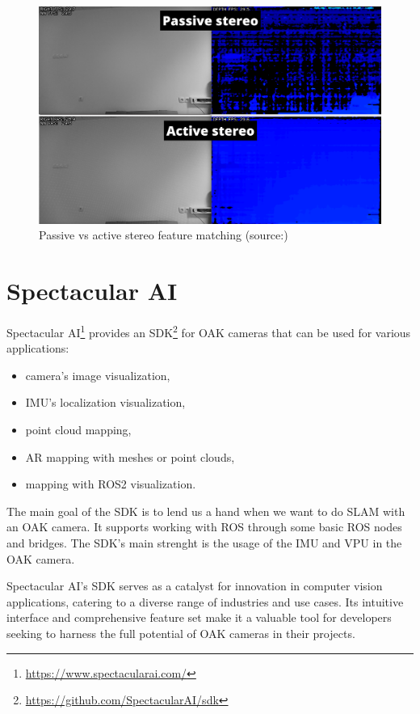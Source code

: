 \begin{figure}[H]
    \centering
    \includegraphics[width=150mm, keepaspectratio]{figures/active-vs-passive-stereo.png}
    \caption{Passive vs active stereo feature matching (source:\cite{ActivePassiveStereo})}
    \label{fig:active-passive-stereo}
\end{figure}

\section{Spectacular AI}

Spectacular AI\footnote{\url{https://www.spectacularai.com/}} provides an SDK\footnote{\url{https://github.com/SpectacularAI/sdk}} for OAK cameras that can be used for various applications:
\begin{itemize}
    \item camera's image visualization,
    \item IMU's localization visualization,
    \item point cloud mapping,
    \item AR mapping with meshes or point clouds,
    \item mapping with ROS2 visualization.
\end{itemize}
The main goal of the SDK is to lend us a hand when we want to do SLAM with an OAK camera. It supports working with ROS through some basic ROS nodes and bridges. The SDK's main strenght is the usage of the IMU and VPU in the OAK camera.

Spectacular AI's SDK serves as a catalyst for innovation in computer vision applications, catering to a diverse range of industries and use cases. Its intuitive interface and comprehensive feature set make it a valuable tool for developers seeking to harness the full potential of OAK cameras in their projects.

